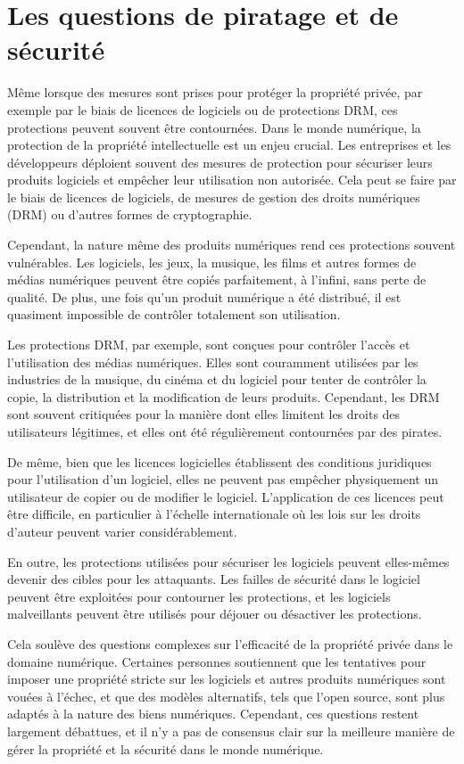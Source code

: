 \section{Les questions de piratage et de sécurité}  Même lorsque des mesures sont prises pour protéger la propriété privée, par exemple par le biais de licences de logiciels ou de protections DRM, ces protections peuvent souvent être contournées.
Dans le monde numérique, la protection de la propriété intellectuelle est un enjeu crucial. Les entreprises et les développeurs déploient souvent des mesures de protection pour sécuriser leurs produits logiciels et empêcher leur utilisation non autorisée. Cela peut se faire par le biais de licences de logiciels, de mesures de gestion des droits numériques (DRM) ou d'autres formes de cryptographie.

Cependant, la nature même des produits numériques rend ces protections souvent vulnérables. Les logiciels, les jeux, la musique, les films et autres formes de médias numériques peuvent être copiés parfaitement, à l'infini, sans perte de qualité. De plus, une fois qu'un produit numérique a été distribué, il est quasiment impossible de contrôler totalement son utilisation.

Les protections DRM, par exemple, sont conçues pour contrôler l'accès et l'utilisation des médias numériques. Elles sont couramment utilisées par les industries de la musique, du cinéma et du logiciel pour tenter de contrôler la copie, la distribution et la modification de leurs produits. Cependant, les DRM sont souvent critiquées pour la manière dont elles limitent les droits des utilisateurs légitimes, et elles ont été régulièrement contournées par des pirates.

De même, bien que les licences logicielles établissent des conditions juridiques pour l'utilisation d'un logiciel, elles ne peuvent pas empêcher physiquement un utilisateur de copier ou de modifier le logiciel. L'application de ces licences peut être difficile, en particulier à l'échelle internationale où les lois sur les droits d'auteur peuvent varier considérablement.

En outre, les protections utilisées pour sécuriser les logiciels peuvent elles-mêmes devenir des cibles pour les attaquants. Les failles de sécurité dans le logiciel peuvent être exploitées pour contourner les protections, et les logiciels malveillants peuvent être utilisés pour déjouer ou désactiver les protections.

Cela soulève des questions complexes sur l'efficacité de la propriété privée dans le domaine numérique. Certaines personnes soutiennent que les tentatives pour imposer une propriété stricte sur les logiciels et autres produits numériques sont vouées à l'échec, et que des modèles alternatifs, tels que l'open source, sont plus adaptés à la nature des biens numériques. Cependant, ces questions restent largement débattues, et il n'y a pas de consensus clair sur la meilleure manière de gérer la propriété et la sécurité dans le monde numérique.

